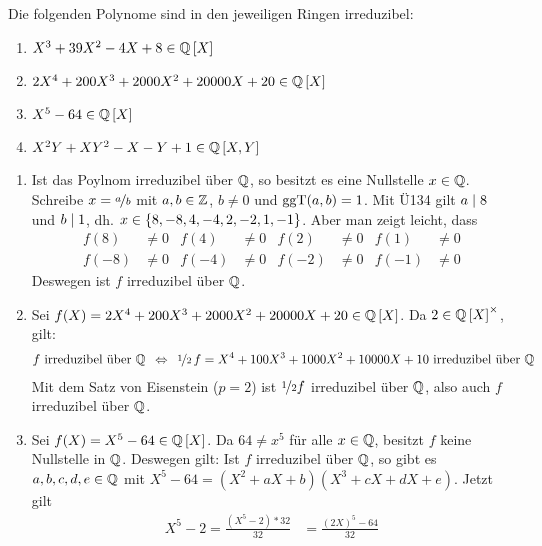 \begin{exercisePage}
	\begin{exercise}
		Die folgenden Polynome sind in den jeweiligen Ringen irreduzibel:
		\begin{enumerate}[leftmargin=*, noitemsep, label=(\alph*)]
			\item $X^3 + 39X^2 - 4X + 8 \in \mathbb{Q} \left[ X \right]$
            \item $2X^4 + 200X^3 + 2000X^2 + 20000X + 20 \in \mathbb{Q} \left[ X \right]$
            \item $X^5 - 64 \in \mathbb{Q} \left[ X \right]$
            \item $X^2Y + XY^2 - X - Y + 1 \in \mathbb{Q} \left[ X,Y \right]$
		\end{enumerate}
	\end{exercise}
    \begin{solution}
        \begin{enumerate}[leftmargin=*, label=(\alph*)]
            \item Ist das Poylnom irreduzibel über $\mathbb{Q}$, so besitzt es eine Nullstelle $x \in \mathbb{Q}$. Schreibe $x = \lfrac{a}{b}$ mit $a,b \in \mathbb{Z}$, $b \neq 0$ und $\operatorname{ggT}(a,b) = 1$. Mit Ü134 gilt $a \mathrel{\mid} 8$ und $b \mathrel{\mid} 1$, dh. $x \in \left\{ 8,-8,4,-4,2,-2,1,-1 \right\}$. Aber man zeigt leicht, dass
            \begin{align*}
            f( 8) &\neq 0 & f( 4) &\neq 0 & f( 2) &\neq 0 & f( 1) &\neq 0 \\
            f(-8) &\neq 0 & f(-4) &\neq 0 & f(-2) &\neq 0 & f(-1) &\neq 0
            \end{align*}
            Deswegen ist $f$ irreduzibel über $\mathbb{Q}$.
            \item Sei $f(X) = 2X^4 + 200X^3 + 2000X^2 + 20000X + 20 \in \mathbb{Q} \left[ X \right]$. Da $2 \in {\mathbb{Q}\left[ X \right]}^{\times}$, gilt: 
            \begin{align*}
                f \text{ irreduzibel über } \Q \equivalent \lfrac{1}{2} \, f = X^4 + 100X^3 + 1000X^2 + 10000X + 10 \text{ irreduzibel über } \Q
            \end{align*}
            Mit dem Satz von Eisenstein ($p=2$) ist $\lfrac{1}{2} f$ irreduzibel über $\mathbb{Q}$, also auch $f$ irreduzibel über $\mathbb{Q}$.
            \item Sei $f(X) = X^5 - 64 \in \mathbb{Q} \left[ X \right]$. Da $64 \neq x^5$ für alle $x \in \mathbb{Q}$, besitzt $f$ keine Nullstelle in $\mathbb{Q}$. Deswegen gilt: Ist $f$ irreduzibel über $\mathbb{Q}$, so gibt es $a,b,c,d,e \in \mathbb{Q}$ mit $X^5 - 64 = (X^2 + aX + b) (X^3 + cX + dX + e)$. Jetzt gilt
            \begin{align*}
                X^5 -2 = \frac{(X^5 - 2) * 32}{32} &= \frac{(2X)^5 - 64}{32} \\

\end{align*}
\end{enumerate}
\end{solution}
\end{exercisePage}
